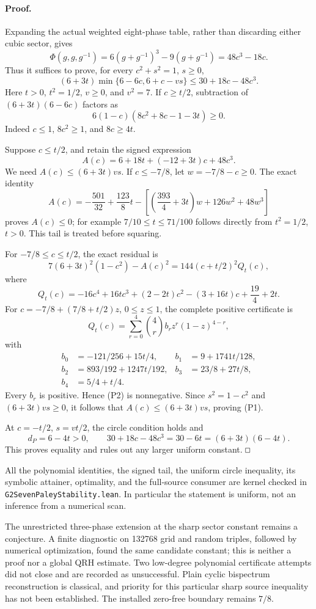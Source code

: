 \documentclass[11pt]{article}
\renewcommand{\square}{\mathord{\vcenter{\hrule\hbox{\vrule height .45em\kern .45em\vrule}\hrule}}}
\begin{document}
\paragraph{Proof.}
Expanding the actual weighted eight-phase table, rather than discarding
either cubic sector, gives
\[
 \Phi(g,g,g^{-1})
 =6(g+g^{-1})^3-9(g+g^{-1})=48c^3-18c.
\]
Thus it suffices to prove, for every \(c^2+s^2=1\), \(s\ge0\),
\[
 (6+3t)\min\{6-6c,6+c-vs\}\le30+18c-48c^3.                 \tag{P1}
\]
Here \(t>0\), \(t^2=1/2\), \(v\ge0\), and \(v^2=7\).
If \(c\ge t/2\), subtraction of \((6+3t)(6-6c)\) factors as
\[
 6(1-c)(8c^2+8c-1-3t)\ge0.
\]
Indeed \(c\le1\), \(8c^2\ge1\), and \(8c\ge4t\).

Suppose \(c\le t/2\), and retain the signed expression
\[
 A(c)=6+18t+(-12+3t)c+48c^3.
\]
We need \(A(c)\le(6+3t)vs\). If \(c\le-7/8\), let
\(w=-7/8-c\ge0\). The exact identity
\[
 A(c)=-\frac{501}{32}+\frac{123}8t
 -\left[\left(\frac{393}4+3t\right)w+126w^2+48w^3\right]
\]
proves \(A(c)\le0\); for example \(7/10\le t\le71/100\)
follows directly from \(t^2=1/2\), \(t>0\).
This tail is treated before squaring.

For \(-7/8\le c\le t/2\), the exact residual is
\[
 7(6+3t)^2(1-c^2)-A(c)^2
   =144(c+t/2)^2Q_t(c),                                  \tag{P2}
\]
where
\[
 Q_t(c)=-16c^4+16tc^3+(2-2t)c^2-(3+16t)c+\frac{19}4+2t.
\]
For \(c=-7/8+(7/8+t/2)z\), \(0\le z\le1\), the complete
positive certificate is
\[
 Q_t(c)=\sum_{r=0}^4 \binom{4}{r}b_rz^r(1-z)^{4-r},
\]
with
\[
\begin{aligned}
 b_0&=-121/256+15t/4,& b_1&=9+1741t/128,\\
 b_2&=893/192+1247t/192,& b_3&=23/8+27t/8,\\
 b_4&=5/4+t/4.
\end{aligned}
\]
Every \(b_r\) is positive. Hence (P2) is nonnegative.
Since \(s^2=1-c^2\) and \((6+3t)vs\ge0\), it follows that
\(A(c)\le(6+3t)vs\), proving (P1).

At \(c=-t/2\), \(s=vt/2\), the circle condition holds and
\[
 d_P=6-4t>0,\qquad
 30+18c-48c^3=30-6t=(6+3t)(6-4t).
\]
This proves equality and rules out any larger uniform constant.
\hfill$\square$

All the polynomial identities, the signed tail, the uniform circle
inequality, its symbolic attainer, optimality, and the full-source
consumer are kernel checked in
\texttt{G2SevenPaleyStability.lean}. In particular the statement is
uniform, not an inference from a numerical scan.

The unrestricted three-phase extension at the sharp sector constant
remains a conjecture. A finite
diagnostic on 132768 grid and random triples, followed by numerical
optimization, found the same candidate constant; this is neither a proof
nor a global QRH estimate. Two low-degree polynomial certificate attempts
did not close and are recorded as unsuccessful. Plain cyclic bispectrum
reconstruction is classical, and priority for this particular sharp
source inequality has not been established. The installed zero-free
boundary remains \(7/8\).
\end{document}
